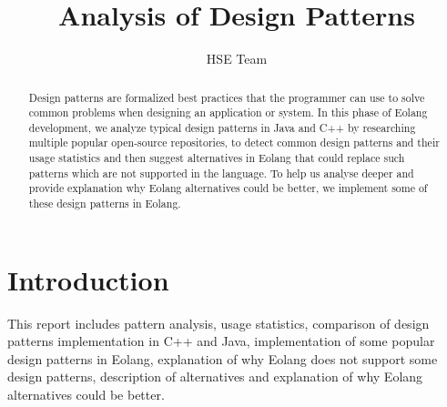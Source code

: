 \documentclass[sigplan,12pt,nonacm=true,review=false]{acmart}
\title{Analysis of Design Patterns}
\author{HSE Team}{}{}
\affiliation{%
  \institution{HSE}
  \city{Moscow,Russia}
}
\begin{document}
\begin{abstract}
Design patterns are formalized best practices that the programmer can use to solve common problems when designing an application or system. In this phase of Eolang development, we analyze typical design patterns in Java and C++ by researching multiple popular open-source repositories, to detect common design patterns and their usage statistics and then suggest alternatives in Eolang that could replace such patterns which are not supported in the language. To help us analyse deeper and provide explanation why Eolang alternatives could be better, we implement some of these design patterns in Eolang.
\end{abstract}
\maketitle

\section{Introduction}
This report includes pattern analysis, usage statistics, comparison of design patterns implementation in C++ and Java, implementation of some popular design patterns in Eolang, explanation of why Eolang does not support some design patterns, description of alternatives and explanation of why Eolang alternatives could be better.
\end{document}
